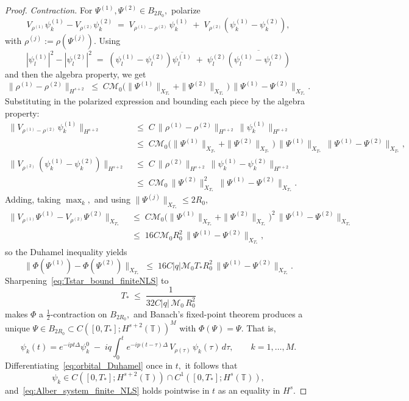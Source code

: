 \documentclass[11pt]{amsart}
\theoremstyle{definition}
\newcommand{\T}{\mathbb{T}}
\begin{document}
\begin{proof}
\noindent\emph{Contraction.} For $\Psi^{(1)},\Psi^{(2)}\in B_{2R_0},$ polarize
\[
  V_{\rho^{(1)}}\psi_k^{(1)}-V_{\rho^{(2)}}\psi_k^{(2)}\;=\;V_{\rho^{(1)}-\rho^{(2)}}\,\psi_k^{(1)}\;+\;V_{\rho^{(2)}}(\psi_k^{(1)}-\psi_k^{(2)}),
\]
with $\rho^{(j)}:=\rho(\Psi^{(j)}).$ Using
\[
  |\psi_l^{(1)}|^2-|\psi_l^{(2)}|^2\;=\;(\psi_l^{(1)}-\psi_l^{(2)})\overline{\psi_l^{(1)}}\;+\;\psi_l^{(2)}\overline{(\psi_l^{(1)}-\psi_l^{(2)})}
\]
and then the algebra property, we get
\[
  \|\rho^{(1)}-\rho^{(2)}\|_{H^{s+2}}\;\le\;C\mathcal{M}_0\bigl(\|\Psi^{(1)}\|_{X_{T_*}}+\|\Psi^{(2)}\|_{X_{T_*}}\bigr)\,\|\Psi^{(1)}-\Psi^{(2)}\|_{X_{T_*}}.
\]
Substituting in the polarized expression and bounding each piece by the algebra property:
\begin{align*}
  \|V_{\rho^{(1)}-\rho^{(2)}}\,\psi_k^{(1)}\|_{H^{s+2}}
  &\;\le\;C\,\|\rho^{(1)}-\rho^{(2)}\|_{H^{s+2}}\,\|\psi_k^{(1)}\|_{H^{s+2}}\\
  &\;\le\;C\mathcal{M}_0\bigl(\|\Psi^{(1)}\|_{X_{T_*}}+\|\Psi^{(2)}\|_{X_{T_*}}\bigr)\,\|\Psi^{(1)}\|_{X_{T_*}}\,\|\Psi^{(1)}-\Psi^{(2)}\|_{X_{T_*}},\\[2pt]
  \|V_{\rho^{(2)}}\,(\psi_k^{(1)}-\psi_k^{(2)})\|_{H^{s+2}}
  &\;\le\;C\,\|\rho^{(2)}\|_{H^{s+2}}\,\|\psi_k^{(1)}-\psi_k^{(2)}\|_{H^{s+2}}\\
  &\;\le\;C\mathcal{M}_0\,\|\Psi^{(2)}\|_{X_{T_*}}^2\,\|\Psi^{(1)}-\Psi^{(2)}\|_{X_{T_*}}.
\end{align*}
Adding, taking $\max_k,$ and using $\|\Psi^{(j)}\|_{X_{T_*}}\le 2R_0,$
\[
\begin{aligned}
  \|V_{\rho^{(1)}}\Psi^{(1)}-V_{\rho^{(2)}}\Psi^{(2)}\|_{X_{T_*}}
  &\;\le\;C\mathcal{M}_0\bigl(\|\Psi^{(1)}\|_{X_{T_*}}+\|\Psi^{(2)}\|_{X_{T_*}}\bigr)^{\!2}\,\|\Psi^{(1)}-\Psi^{(2)}\|_{X_{T_*}}\\
  &\;\le\;16C\mathcal{M}_0 R_0^2\,\|\Psi^{(1)}-\Psi^{(2)}\|_{X_{T_*}},
\end{aligned}
\]
so the Duhamel inequality yields
\[
  \|\Phi(\Psi^{(1)})-\Phi(\Psi^{(2)})\|_{X_{T_*}}
  \;\le\;16C|q|\mathcal{M}_0 T_* R_0^2\,\|\Psi^{(1)}-\Psi^{(2)}\|_{X_{T_*}}.
\]
Sharpening~\eqref{eq:Tstar_bound_finiteNLS} to
\[
  T_*\;\le\;\frac{1}{32C|q|\,\mathcal{M}_0\,R_0^2}
\]
makes $\Phi$ a $\tfrac12$-contraction on $B_{2R_0},$ and Banach's fixed-point theorem produces a unique $\Psi\in B_{2R_0}\subset C([0,T_*];H^{s+2}(\T))^M$ with $\Phi(\Psi)=\Psi.$ %
That is,
\begin{equation}\label{eq:orbital_Duhamel}
  \psi_k(t)=e^{-ipt\Delta}\psi_k^0
  \;-\;iq\int_0^t e^{-ip(t-\tau)\Delta}\,V_{\rho(\tau)}\,\psi_k(\tau)\,d\tau,
  \qquad k=1,\dots,M.
\end{equation}
Differentiating~\eqref{eq:orbital_Duhamel} once in $t,$ it follows that
\[
  \psi_k\in C([0,T_*];H^{s+2}(\T))\cap C^1([0,T_*];H^s(\T)),
\]
and~\eqref{eq:Alber_system_finite_NLS} holds pointwise in $t$ as an equality in $H^s.$



\end{proof}
\end{document}

